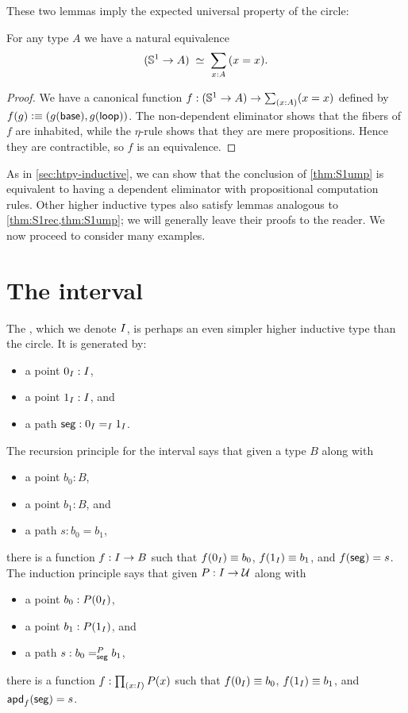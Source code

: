 These two lemmas imply the expected universal property of the circle:

\begin{lem}\label{thm:S1ump}
  For any type $A$ we have a natural equivalence
  \[ (\Sn^1 \to A) \;\eqvsym\;
  \sm{x:A} (x=x).
  \]
\end{lem}
\begin{proof}
  We have a canonical function $f:(\Sn^1 \to A) \to \sm{x:A} (x=x)$ defined by $f(g) \defeq (g(\base),\ap g \lloop)$.
  The non-dependent eliminator shows that the fibers of $f$ are inhabited, while the $\eta$-rule shows that they are mere propositions.
  Hence they are contractible, so $f$ is an equivalence.
\end{proof}

As in \autoref{sec:htpy-inductive}, we can show that the conclusion of \autoref{thm:S1ump} is equivalent to having a dependent eliminator with propositional computation rules.
Other higher inductive types also satisfy lemmas analogous to \autoref{thm:S1rec,thm:S1ump}; we will generally leave their proofs to the reader.
We now proceed to consider many examples.


\section{The interval}
\label{sec:interval}

%
%
The , which we denote $\interval$, is perhaps an even simpler higher inductive type than the circle.
It is generated by:
\begin{itemize}
\item a point $\izero:\interval$,
\item a point $\ione:\interval$, and
\item a path $\seg : \id[\interval]\izero\ione$.
\end{itemize}
%
The recursion principle for the interval says that given a type $B$ along with
\begin{itemize}
\item a point $b_0:B$,
\item a point $b_1:B$, and
\item a path $s:b_0=b_1$,
\end{itemize}
there is a function $f:\interval\to B$ such that $f(\izero)\jdeq b_0$, $f(\ione)\jdeq b_1$, and $\ap f \seg = s$.
%
The induction principle says that given $P:\interval\to\type$ along with
\begin{itemize}
\item a point $b_0:P(\izero)$,
\item a point $b_1:P(\ione)$, and
\item a path $s:\dpath{P}{\seg}{b_0}{b_1}$,
\end{itemize}
there is a function $f:\prd{x:\interval} P(x)$ such that $f(\izero)\jdeq b_0$, $f(\ione)\jdeq b_1$, and $\apd f \seg = s$.

